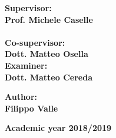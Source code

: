\begin{titlepage}
\par
\noindent
\begin{minipage}[t]{0.47\textwidth}
{\large{\bf Supervisor:\\
Prof. Michele Caselle}}\\
\vspace{4mm}
\\
{\large{\bf Co-supervisor:\\
Dott. Matteo Osella }}
\vspace{8mm}
{\large{\bf \\ Examiner:\\
Dott. Matteo Cereda}}
\end{minipage}
\hfill
\begin{minipage}[t]{0.47\textwidth}\raggedleft
\vspace{16mm}
{\large{\bf Author:\\
Filippo Valle}}
\end{minipage}
\vspace{5mm}
\begin{center}
{\large{\bf
Academic year 2018/2019}}
\end{center}

\end{titlepage}
